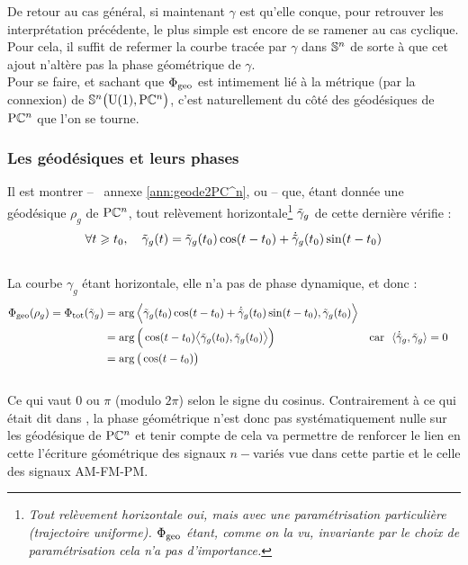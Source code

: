 De retour au cas général, si maintenant $\gamma$ est qu'elle conque, pour retrouver les interprétation précédente, le plus simple est encore de se ramener au cas cyclique.
Pour cela, il suffit de refermer la courbe tracée par $\gamma$ dans $\S{n}$ de sorte à que cet ajout n'altère pas la phase géométrique de $\gamma$.
\\

Pour se faire, et sachant que $\phaseg$ est intimement lié à la métrique (par la connexion) de $\VFP$, c'est naturellement du côté des géodésiques de $\PC{n}$ que l'on se tourne.
\\


\subsubsection{Les géodésiques et leurs phases} \label{subsec:phase_g2geode}

 Il est montrer -- \cf~annexe \ref{ann:geode2PC^n}, ou \cite[sec.~3.E]{besse_manifolds_1978} -- que, étant donnée une géodésique $\rho_g$ de $\PC{n}$, tout relèvement horizontale\footnote{\itshape
	Tout relèvement horizontale oui, mais avec une paramétrisation particulière (trajectoire uniforme).  $\phaseg$ étant, comme on la vu, invariante par le choix de paramétrisation cela n'a pas d'importance.}
$\Tilde{\gamma}_g$ de cette dernière vérifie :
\begin{equation}\label{eq:2geodesique}
	\forall t\geq t_0,\quad \Tilde{\gamma}_g(t) = \Tilde{\gamma}_g(t_0) \cos (t - t_0) + \dot{\Tilde{\gamma}}_g(t_0) \sin (t - t_0)
\end{equation}
\\
La courbe $\gamma_g$ étant horizontale, elle n'a pas de phase dynamique, et donc :
\begin{equation} \label{eq:phase_g2geode}
	\begin{aligned}
		\phaseg(\rho_g) = \phaset(\Tilde{\gamma}_g) 
		&= \arg\Big\langle \Tilde{\gamma}_g(t_0) \cos (t - t_0) + \dot{\Tilde{\gamma}}_g(t_0) \sin (t - t_0),  \Tilde{\gamma}_g(t_0) \Big\rangle \\
		&= \arg\Big(\cos (t - t_0)\big\langle \Tilde{\gamma}_g(t_0) ,  \Tilde{\gamma}_g(t_0) \big\rangle\Big)   &  \text{car }\ \langle\dot{\Tilde{\gamma}}_g,  \Tilde{\gamma}_g \rangle &= 0\\
		&= \arg\big(\cos (t - t_0)\big)
	\end{aligned}
\end{equation}
\\ 
Ce qui vaut $0$ ou $\pi$ (modulo $2\pi$) selon le signe du cosinus. 
Contrairement à ce qui était dit dans \cite{mukunda_quantum_1993}, la phase géométrique n'est donc pas systématiquement nulle sur les géodésique de $\PC{n}$ et tenir compte de cela va permettre de renforcer le lien en cette l'écriture géométrique des signaux $n-$variés vue dans cette partie et le celle des signaux AM-FM-PM.
\\ 

